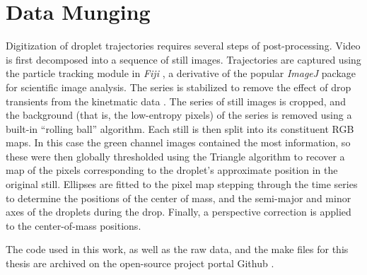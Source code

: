 \documentclass[12pt,a4paper,oneside]{book}
\begin{document}
\section{Data Munging}
Digitization of droplet trajectories requires several steps of post-processing. Video is first decomposed into a sequence of still images. Trajectories are captured using the particle tracking module in \emph{Fiji} \cite{schindelin_fiji:_2012}, a derivative of the popular \emph{ImageJ} \cite{schneider_nih_2012} package for scientific image analysis. The series is stabilized to remove the effect of drop transients from the kinetmatic data \cite{li_image_2008}. The series of still images is cropped, and the background (that is, the low-entropy pixels) of the series is removed using a built-in ``rolling ball'' algorithm. Each still is then split into its constituent RGB maps. In this case the green channel images contained the most information, so these were then globally thresholded using the Triangle algorithm to recover a map of the pixels corresponding to the droplet's approximate position in the original still. Ellipses are fitted to the pixel map stepping through the time series to determine the positions of the center of mass, and the semi-major and minor axes of the droplets during the drop. Finally, a perspective correction is applied to the center-of-mass positions. 

The code used in this work, as well as the raw data, and the make files for this thesis are archived on the open-source project portal Github \cite{schmidt_droplet_electro-bounce:_2017}.
\end{document}

